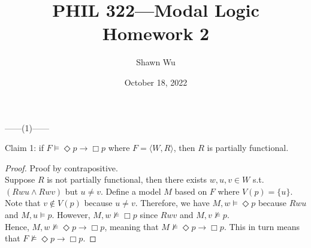 \documentclass[12pt]{article}
\title{PHIL 322---Modal Logic \\Homework 2}
\author{Shawn Wu}
\date{October 18, 2022}
\newcommand{\B}{\Box}
\newcommand{\D}{\Diamond}
\newcommand{\ns}{\nvDash}
\begin{document}
\maketitle
\noindent
\begin{center}
    ------(1)------
\end{center}
Claim 1: if $F \vDash \D p \rightarrow \B p$ where $F = \langle W, R \rangle$, then $R$ is partially functional. 
\begin{proof} Proof by contrapositive.\\
    Suppose $R$ is not partially functional, then there exists $w, u, v \in W$ s.t. $(Rwu \land Rwv)$ but $u \neq v$.
    Define a model $M$ based on $F$ where $V(p) = \{ u \}$. 
    Note that $v \notin V(p)$ because $u \neq v$.
    Therefore, we have $M, w \vDash \D p$ because $Rwu$ and $M, u \vDash p$.
    However, $M, w \nvDash \B p$ since $Rwv$ and $M, v \ns p$.\\
    Hence, $M, w \ns \D p \to \B p$, meaning that $M \ns \D p \to \B p$.
    This in turn means that $F \ns \D p \to \B p$.
\end{proof}
\end{document}
